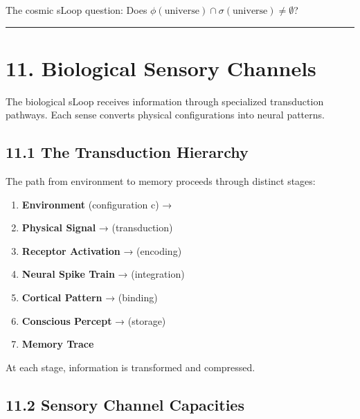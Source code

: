 \documentclass[
  11pt,
  letterpaper,
  twoside,
  openright]{book}
\providecommand{\tightlist}{%
  \setlength{\itemsep}{0pt}\setlength{\parskip}{0pt}}
\begin{document}
The cosmic sLoop question: Does
\(\phi(\text{universe}) \cap \sigma(\text{universe}) \neq \emptyset\)?

\begin{center}\rule{0.5\linewidth}{0.5pt}\end{center}

\section{11. Biological Sensory
Channels}\label{biological-sensory-channels}

The biological sLoop receives information through specialized
transduction pathways. Each sense converts physical configurations into
neural patterns.

\subsection{11.1 The Transduction
Hierarchy}\label{the-transduction-hierarchy}

The path from environment to memory proceeds through distinct stages:

\begin{enumerate}
\def\labelenumi{\arabic{enumi}.}
\tightlist
\item
  \textbf{Environment} (configuration c) →
\item
  \textbf{Physical Signal} → (transduction)
\item
  \textbf{Receptor Activation} → (encoding)
\item
  \textbf{Neural Spike Train} → (integration)
\item
  \textbf{Cortical Pattern} → (binding)
\item
  \textbf{Conscious Percept} → (storage)
\item
  \textbf{Memory Trace}
\end{enumerate}

At each stage, information is transformed and compressed.

\subsection{11.2 Sensory Channel
Capacities}\label{sensory-channel-capacities}
\end{document}
